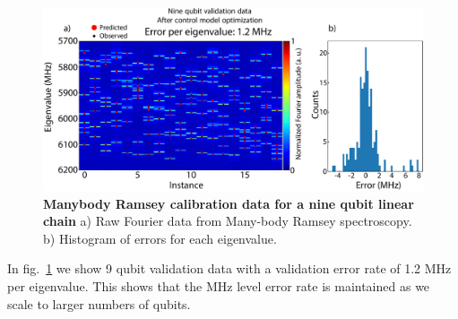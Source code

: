 \begin{figure}[h]
    \begin{center}
        \includegraphics[width=150 mm]{./PDF/mbr_9q_validation.pdf}
    \end{center}
        \caption{\textbf{Manybody Ramsey calibration data for a nine qubit linear chain}
        a) Raw Fourier data from Many-body Ramsey spectroscopy.  b) Histogram of errors for each eigenvalue.
        }
    \label{9q manybody ramsey validation}
\end{figure}
In fig.~\ref{9q manybody ramsey validation} we show 9 qubit validation data with a validation error rate of 1.2 MHz per eigenvalue.
This shows that the MHz level error rate is maintained as we scale to larger numbers of qubits.

